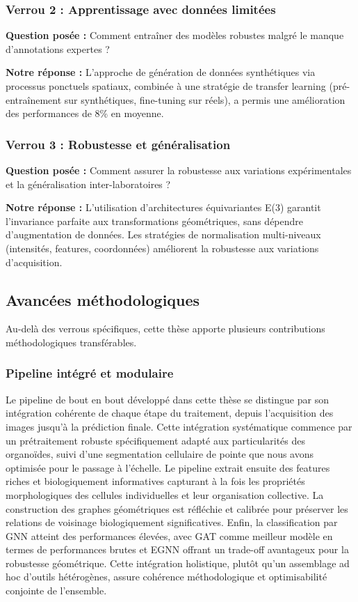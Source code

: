 \subsubsection{Verrou 2 : Apprentissage avec données limitées}

\textbf{Question posée :} Comment entraîner des modèles robustes malgré le manque d'annotations expertes ?

\textbf{Notre réponse :}
L'approche de génération de données synthétiques via processus ponctuels spatiaux, combinée à une stratégie de transfer learning (pré-entraînement sur synthétiques, fine-tuning sur réels), a permis une amélioration des performances de 8\% en moyenne.

\subsubsection{Verrou 3 : Robustesse et généralisation}

\textbf{Question posée :} Comment assurer la robustesse aux variations expérimentales et la généralisation inter-laboratoires ?

\textbf{Notre réponse :}
L'utilisation d'architectures équivariantes E(3) garantit l'invariance parfaite aux transformations géométriques, sans dépendre d'augmentation de données. Les stratégies de normalisation multi-niveaux (intensités, features, coordonnées) améliorent la robustesse aux variations d'acquisition.
\subsection{Avancées méthodologiques}

Au-delà des verrous spécifiques, cette thèse apporte plusieurs contributions méthodologiques transférables.

\subsubsection{Pipeline intégré et modulaire}

Le pipeline de bout en bout développé dans cette thèse se distingue par son intégration cohérente de chaque étape du traitement, depuis l'acquisition des images jusqu'à la prédiction finale. Cette intégration systématique commence par un prétraitement robuste spécifiquement adapté aux particularités des organoïdes, suivi d'une segmentation cellulaire de pointe que nous avons optimisée pour le passage à l'échelle. Le pipeline extrait ensuite des features riches et biologiquement informatives capturant à la fois les propriétés morphologiques des cellules individuelles et leur organisation collective. La construction des graphes géométriques est réfléchie et calibrée pour préserver les relations de voisinage biologiquement significatives. Enfin, la classification par GNN atteint des performances élevées, avec GAT comme meilleur modèle en termes de performances brutes et EGNN offrant un trade-off avantageux pour la robustesse géométrique. Cette intégration holistique, plutôt qu'un assemblage ad hoc d'outils hétérogènes, assure cohérence méthodologique et optimisabilité conjointe de l'ensemble.

